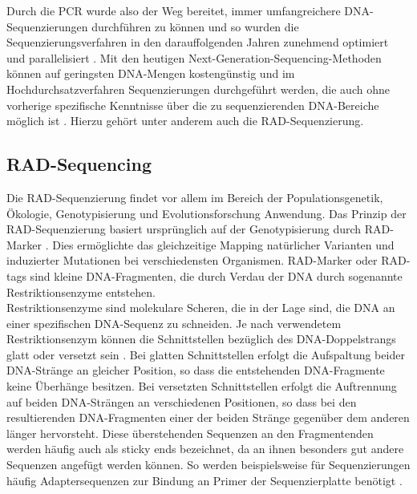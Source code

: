 Durch die PCR wurde also der Weg bereitet, immer umfangreichere DNA-Sequenzierungen durchführen zu können und so wurden die Sequenzierungsverfahren in den darauffolgenden Jahren zunehmend optimiert und parallelisiert \cite{shendure_2008}. Mit den heutigen Next-Generation-Sequencing-Methoden \cite{rizzo_2012, ambardar_2016} können auf geringsten DNA-Mengen kostengünstig und im Hochdurchsatzverfahren Sequenzierungen durchgeführt werden, die auch ohne vorherige spezifische Kenntnisse über die zu sequenzierenden DNA-Bereiche möglich ist \cite{dijk_2014} . Hierzu gehört unter anderem auch die RAD-Sequenzierung.

\subsection{RAD-Sequencing} \label{sec:rad}

Die RAD-Sequenzierung findet vor allem im Bereich der Populationsgenetik, Ökologie, Genotypisierung und Evolutionsforschung Anwendung. Das Prinzip der RAD-Sequenzierung basiert ursprünglich auf der Genotypisierung durch RAD-Marker \cite{miller_2007}. Dies ermöglichte das gleichzeitige Mapping natürlicher Varianten und induzierter Mutationen bei verschiedensten Organismen. RAD-Marker oder RAD-tags sind kleine DNA-Fragmenten, die durch Verdau der DNA durch sogenannte Restriktionsenzyme entstehen. \\

Restriktionsenzyme sind molekulare Scheren, die in der Lage sind, die DNA an einer spezifischen DNA-Sequenz zu schneiden. Je nach verwendetem Restriktionsenzym können die Schnittstellen bezüglich des DNA-Doppelstrangs glatt oder versetzt sein \cite{roberts_2003}. Bei glatten Schnittstellen erfolgt die Aufspaltung beider DNA-Stränge an gleicher Position, so dass die entstehenden DNA-Fragmente keine Überhänge besitzen. Bei versetzten Schnittstellen erfolgt die Auftrennung auf beiden DNA-Strängen an verschiedenen Positionen, so dass bei den resultierenden DNA-Fragmenten einer der beiden Stränge gegenüber dem anderen länger hervorsteht. Diese überstehenden Sequenzen an den Fragmentenden werden häufig auch als sticky ends bezeichnet, da an ihnen besonders gut andere Sequenzen angefügt werden können. So werden beispielsweise für Sequenzierungen häufig Adaptersequenzen zur Bindung an Primer der Sequenzierplatte benötigt \cite{mardis_2017}. \\

